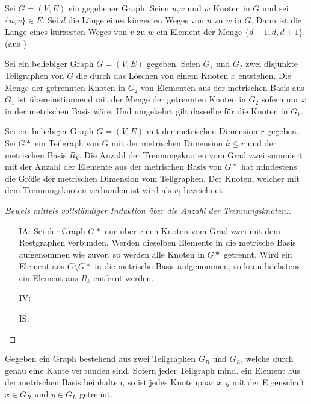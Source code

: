 \begin{lem}
\label{dist}
Sei $G=(V,E)$ ein gegebener Graph. Seien $u,v$ und $w$ Knoten in $G$ und sei $\{u,v\}\in E$. Sei $d$ die Länge eines kürzesten Weges von $u$ zu $w$ in $G$. Dann ist die Länge eines kürzesten Weges von $v$ zu $w$ ein Element der Menge $\{d-1,d,d+1\}$. (aus \cite{Landmarks})
\end{lem}
\begin{lem}
\label{trennungsknoten}
Sei ein beliebiger Graph $G=(V,E)$ gegeben. Seien $G_1$ und $G_2$ zwei disjunkte Teilgraphen von $G$ die durch das Löschen von einem Knoten $x$ entstehen. Die Menge der getrennten Knoten in $G_2$ von Elementen aus der metrischen Basis aus $G_1$ ist übereinstimmend mit der Menge der getrennten Knoten in $G_2$ sofern nur $x$ in der metrischen Basis wäre. Und umgekehrt gilt dasselbe für die Knoten in $G_1$.
\end{lem}
\begin{lem}
\label{sepvertex}
Sei ein beliebiger Graph $G=(V,E)$ mit der metrischen Dimension $r$ gegeben. Sei $G*$ ein Teilgraph von $G$ mit der metrischen Dimension $k \leq r$ und der metrischen Basis $R_k$. Die Anzahl der Trennungsknoten vom Grad zwei summiert mit der Anzahl der Elemente aus der metrischen Basis von $G*$ hat mindestens die Größe der metrischen Dimension vom Teilgraphen. Der Knoten, welcher mit dem Trennungsknoten verbunden ist wird als $v_t$ bezeichnet.
\end{lem}
\begin{proof}[Beweis mittels vollständiger Induktion über die Anzahl der Trennungsknoten:]$\;$
\begin{itemize}
\item[IA:] Sei der Graph $G*$ nur über einen Knoten vom Grad zwei mit dem Restgraphen verbunden. Werden dieselben Elemente in die metrische Basis aufgenommen wie zuvor, so werden alle Knoten in $G*$ getrennt. 
Wird ein Element aus $G\setminus{G*}$ in die metrische Basis aufgenommen, so kann höchstens ein Element aus $R_k$ entfernt werden. 
\item[IV:] 
\item[IS:]
\end{itemize}
\end{proof}
\begin{lem}
\label{first_theorem}
Gegeben ein Graph bestehend aus zwei Teilgraphen $G_R$ und $G_L$, welche durch genau eine Kante verbunden sind. Sofern jeder Teilgraph mind. ein Element aus der metrischen Basis beinhalten, so ist jedes Knotenpaar $x,y$ mit der Eigenschaft $x \in G_R$ und $y \in G_L$ getrennt.
\end{lem}

